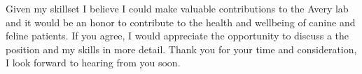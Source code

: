 \documentclass[11pt,a4paper,sans]{moderncv}
\begin{document}
\begin{spacing}{1.1}
Given my skillset I believe I could make valuable contributions to the Avery lab and it would be an honor to contribute to the health and wellbeing of canine and feline patients. 
If you agree, I would appreciate the opportunity to discuss a the position and my skills in more detail. 
Thank you for your time and consideration, I look forward to hearing from you soon.


 

\end{spacing}
\makeletterclosing
\end{document}
